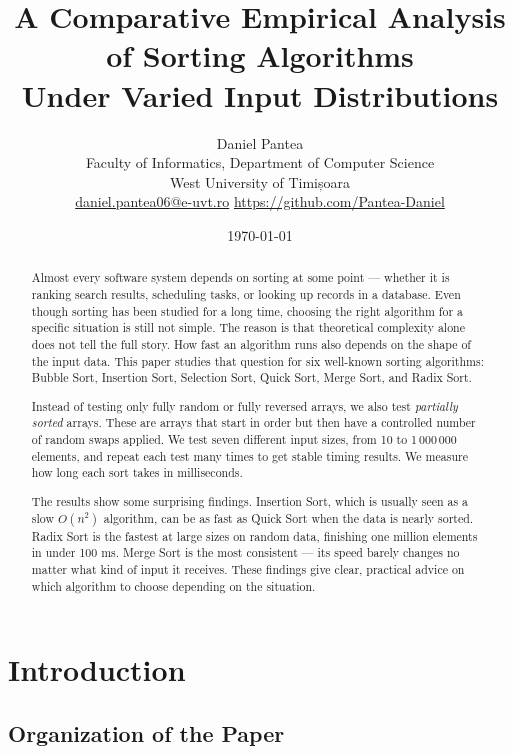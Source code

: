 \documentclass[12pt,a4paper]{article}
\title{\textbf{A Comparative Empirical Analysis of Sorting Algorithms\\
Under Varied Input Distributions}}
\author{
  Daniel Pantea \\
  \small Faculty of Informatics, Department of Computer Science \\
  \small West University of Timișoara \\
  \small \href{mailto:daniel.pantea06@e-uvt.ro}{daniel.pantea06@e-uvt.ro}
  \small \href{https://github.com/Pantea-Daniel}{https://github.com/Pantea-Daniel}
}
\date{\today}
\theoremstyle{definition}
\begin{document}
\maketitle
\thispagestyle{empty}

\begin{abstract}
Almost every software system depends on sorting at some point --- whether it is ranking search results, scheduling tasks, or looking up records in a database. Even though sorting has been studied for a long time, choosing the right algorithm for a specific situation is still not simple. The reason is that theoretical complexity alone does not tell the full story. How fast an algorithm runs also depends on the shape of the input data. This paper studies that question for six well-known sorting algorithms: Bubble Sort, Insertion Sort, Selection Sort, Quick Sort, Merge Sort, and Radix Sort.

Instead of testing only fully random or fully reversed arrays, we also test \emph{partially sorted} arrays. These are arrays that start in order but then have a controlled number of random swaps applied. We test seven different input sizes, from 10 to 1\,000\,000 elements, and repeat each test many times to get stable timing results. We measure how long each sort takes in milliseconds.

The results show some surprising findings. Insertion Sort, which is usually seen as a slow $O(n^2)$ algorithm, can be as fast as Quick Sort when the data is nearly sorted. Radix Sort is the fastest at large sizes on random data, finishing one million elements in under 100 ms. Merge Sort is the most consistent --- its speed barely changes no matter what kind of input it receives. These findings give clear, practical advice on which algorithm to choose depending on the situation.
\end{abstract}

\newpage
\tableofcontents
\newpage

\section{Introduction}

\subsection{Organization of the Paper}
\end{document}
